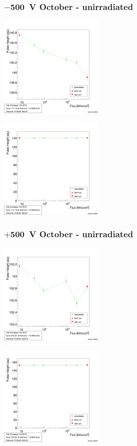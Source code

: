 \documentclass[9pt]{beamer}
\begin{document}
\begin{frame}
	\frametitle{$-$\SI{500}{V} October - unirradiated}
	\begin{minipage}{5.5cm}
		\centering
		\includegraphics[width=5cm]{PHS03}
	\end{minipage}
	\hspace*{2pt}
	\begin{minipage}{5.5cm}
		\centering
		\includegraphics[width=5cm]{PHSZ03}
	\end{minipage}
\end{frame}
\begin{frame}
	\frametitle{$+$\SI{500}{V} October - unirradiated}
	\begin{minipage}{5.5cm}
		\centering
		\includegraphics[width=5cm]{PHS05}
	\end{minipage}
	\hspace*{2pt}
	\begin{minipage}{5.5cm}
		\centering
		\includegraphics[width=5cm]{PHSZ05}
	\end{minipage}
\end{frame}
\end{document}
